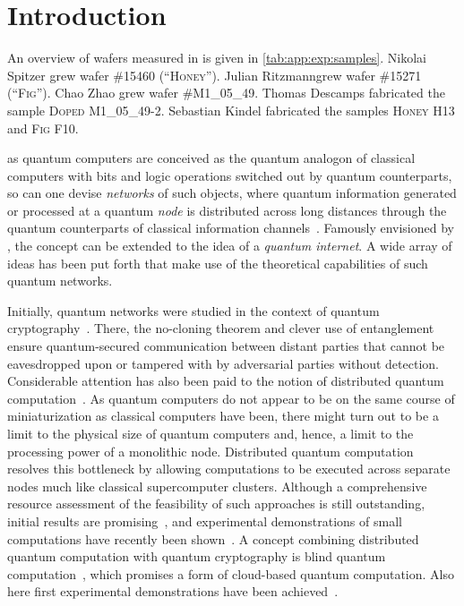 \chapter{Introduction}\label{ch:exp:introduction}

\begin{partcontribs}
    An overview of wafers measured in \thispart is given in \cref{tab:app:exp:samples}.
    Nikolai Spitzer\sidenote[a]{\RUB} grew wafer \textsc{\#15460 (\enquote{Honey})}.
    Julian Ritzmann\sidenotemark[a] grew wafer \textsc{\#15271 (\enquote{Fig})}.
    Chao Zhao grew wafer \textsc{\#M1\_05\_49}.
    Thomas Descamps fabricated the sample \textsc{Doped M1\_05\_49-2}.
    Sebastian Kindel\sidenote[d]{\RWTHFZJ} fabricated the samples \textsc{Honey H13} and \textsc{Fig F10}.
\end{partcontribs}

 as quantum computers are conceived as the quantum analogon of classical computers with bits and logic operations switched out by quantum counterparts, so can one devise \emph{networks} of such objects, where quantum information generated or processed at a quantum \emph{node} is distributed across long distances through the quantum counterparts of classical information channels~\cite{Nielsen2011,Simon2017}.
Famously envisioned by \citet{Kimble2008}, the concept can be extended to the idea of a \emph{quantum internet}.
A wide array of ideas has been put forth that make use of the theoretical capabilities of such quantum networks.

Initially, quantum networks were studied in the context of quantum cryptography~\cite{Bennett1984,Ekert1991,Deutsch1996,Gisin2002}.
There, the no-cloning theorem and clever use of entanglement ensure quantum-secured communication between distant parties that cannot be eavesdropped upon or tampered with by adversarial parties without detection.
Considerable attention has also been paid to the notion of distributed quantum computation~\cite{Cirac1999}.
As quantum computers do not appear to be on the same course of miniaturization as classical computers have been, there might turn out to be a limit to the physical size of quantum computers and, hence, a limit to the processing power of a monolithic node.
Distributed quantum computation resolves this bottleneck by allowing computations to be executed across separate nodes much like classical supercomputer clusters.
Although a comprehensive resource assessment of the feasibility of such approaches is still outstanding, initial results are promising~\cite{Jacinto2025}, and experimental demonstrations of small computations have recently been shown~\cite{Main2025}.
A concept combining distributed quantum computation with quantum cryptography is blind quantum computation~\cite{Childs2005,Giovannetti2013}, which promises a form of cloud-based quantum computation.
Also here first experimental demonstrations have been achieved~\cite{Wei2025}.

